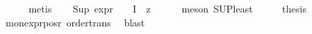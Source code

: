 \begin{isabellebody}
\ \ \ \ \isamarkupfalse%
\ metis\isanewline
\ \ \isamarkupfalse%
\ {\isachardoublequoteopen}Sup\ {\isacharparenleft}{\kern0pt}expr{\isacharunderscore}{\kern0pt}{}\ {\isacharbackquote}{\kern0pt}\ {\isasymPhi}\ {\isacharbackquote}{\kern0pt}\ I{\isacharparenright}{\kern0pt}\ {\isasymle}\ z{\isachardoublequoteclose}\isanewline
\ \ \ \ \isamarkupfalse%
\ {\isacharparenleft}{\kern0pt}meson\ SUP{\isacharunderscore}{\kern0pt}least{\isacharparenright}{\kern0pt}\isanewline
\ \ \isamarkupfalse%
\ \isamarkupfalse%
\ {\isacharquery}{\kern0pt}thesis\isanewline
\ \ \ \ \isamarkupfalse%
\ mon{\isacharunderscore}{\kern0pt}expr{\isacharunderscore}{\kern0pt}{}{\isacharunderscore}{\kern0pt}pos{\isacharunderscore}{\kern0pt}r\ order{\isachardot}{\kern0pt}trans\ \isamarkupfalse%
\ blast\isanewline
{}\isamarkupfalse%
%
\endisatagproof
{\isafoldproof}%
%
\isadelimproof
\isanewline
%
\endisadelimproof
\isanewline
%
\isadelimtheory
\isanewline
%
\endisadelimtheory
%
\isatagtheory
{}\isamarkupfalse%
%
\endisatagtheory
{\isafoldtheory}%
%
\isadelimtheory
%
\endisadelimtheory
%
\end{isabellebody}%
\endinput
